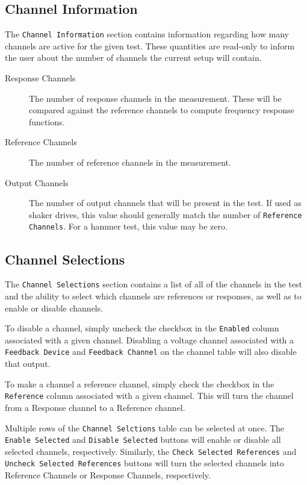 \documentclass[pdf,12pt,report]{SANDreport}
\newcommand{\inlineCode}{\lstinline[basicstyle=\bfseries\ttfamily]}
\begin{document}
    \subsection{Channel Information}
    The \inlineCode{Channel Information} section contains information regarding how many channels are active for the given test.  These quantities are read-only to inform the user about the number of channels the current setup will contain.
    
    \begin{description}
        \item[Response Channels] The number of response channels in the measurement.  These will be compared against the reference channels to compute frequency response functions.
        \item[Reference Channels] The number of reference channels in the measurement.
        \item[Output Channels] The number of output channels that will be present in the test.  If used as shaker drives, this value should generally match the number of \inlineCode{Reference Channels}.  For a hammer test, this value may be zero.
    \end{description}
        
    \subsection{Channel Selections}
    The \inlineCode{Channel Selections} section contains a list of all of the channels in the test and the ability to select which channels are references or responses, as well as to enable or disable channels.
    
    To disable a channel, simply uncheck the checkbox in the \inlineCode{Enabled} column associated with a given channel.  Disabling a voltage channel associated with a \inlineCode{Feedback Device} and \inlineCode{Feedback Channel} on the channel table will also disable that output.
    
    To make a channel a reference channel, simply check the checkbox in the \inlineCode{Reference} column associated with a given channel.  This will turn the channel from a Response channel to a Reference channel.
    
    Multiple rows of the \inlineCode{Channel Selctions} table can be selected at once.  The \inlineCode{Enable Selected} and \inlineCode{Disable Selected} buttons will enable or disable all selected channels, respectively.  Similarly, the \inlineCode{Check Selected References} and \inlineCode{Uncheck Selected References} buttons will turn the selected channels into Reference Channels or Response Channels, respectively.
    
\end{document}

